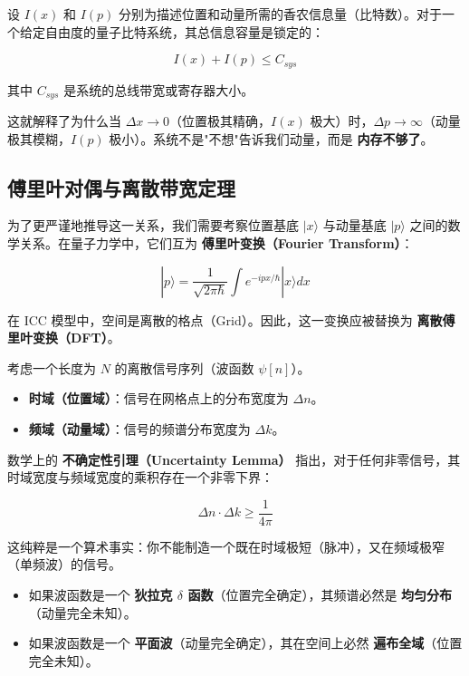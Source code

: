 \begin{definition}[互补变量的信息量守恒]
设 $I(x)$ 和 $I(p)$ 分别为描述位置和动量所需的香农信息量（比特数）。对于一个给定自由度的量子比特系统，其总信息容量是锁定的：

\begin{equation}
I(x) + I(p) \le C_{sys}
\end{equation}

其中 $C_{sys}$ 是系统的总线带宽或寄存器大小。
\end{definition}

这就解释了为什么当 $\Delta x \to 0$（位置极其精确，$I(x)$ 极大）时，$\Delta p \to \infty$（动量极其模糊，$I(p)$ 极小）。系统不是"不想"告诉我们动量，而是 \textbf{内存不够了}。

\subsection{傅里叶对偶与离散带宽定理}

为了更严谨地推导这一关系，我们需要考察位置基底 $|x\rangle$ 与动量基底 $|p\rangle$ 之间的数学关系。在量子力学中，它们互为 \textbf{傅里叶变换（Fourier Transform）}：

\begin{equation}
|p\rangle = \frac{1}{\sqrt{2\pi\hbar}} \int e^{-ipx/\hbar} |x\rangle dx
\end{equation}

在 ICC 模型中，空间是离散的格点（Grid）。因此，这一变换应被替换为 \textbf{离散傅里叶变换（DFT）}。

考虑一个长度为 $N$ 的离散信号序列（波函数 $\psi[n]$）。

\begin{itemize}
\item \textbf{时域（位置域）}：信号在网格点上的分布宽度为 $\Delta n$。

\item \textbf{频域（动量域）}：信号的频谱分布宽度为 $\Delta k$。
\end{itemize}

数学上的 \textbf{不确定性引理（Uncertainty Lemma）} 指出，对于任何非零信号，其时域宽度与频域宽度的乘积存在一个非零下界：

\begin{equation}
\Delta n \cdot \Delta k \ge \frac{1}{4\pi}
\end{equation}

这纯粹是一个算术事实：你不能制造一个既在时域极短（脉冲），又在频域极窄（单频波）的信号。

\begin{itemize}
\item 如果波函数是一个 \textbf{狄拉克 $\delta$ 函数}（位置完全确定），其频谱必然是 \textbf{均匀分布}（动量完全未知）。

\item 如果波函数是一个 \textbf{平面波}（动量完全确定），其在空间上必然 \textbf{遍布全域}（位置完全未知）。
\end{itemize}


